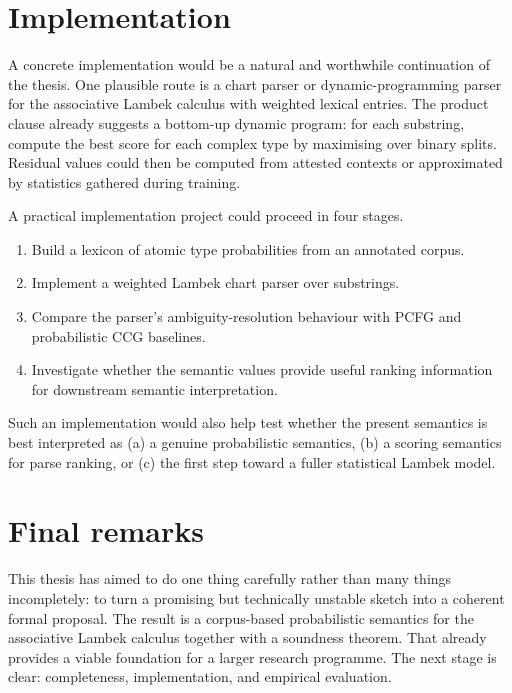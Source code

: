 \section{Implementation}
A concrete implementation would be a natural and worthwhile continuation of the thesis.
One plausible route is a chart parser or dynamic-programming parser for the associative Lambek
calculus with weighted lexical entries. The product clause already suggests a bottom-up dynamic
program: for each substring, compute the best score for each complex type by maximising over
binary splits. Residual values could then be computed from attested contexts or approximated by
statistics gathered during training.

A practical implementation project could proceed in four stages.
\begin{enumerate}[label=(\arabic*)]
    \item Build a lexicon of atomic type probabilities from an annotated corpus.
    \item Implement a weighted Lambek chart parser over substrings.
    \item Compare the parser's ambiguity-resolution behaviour with PCFG and probabilistic CCG
    baselines.
    \item Investigate whether the semantic values provide useful ranking information for downstream
    semantic interpretation.
\end{enumerate}

Such an implementation would also help test whether the present semantics is best interpreted as
(a) a genuine probabilistic semantics, (b) a scoring semantics for parse ranking, or (c) the first
step toward a fuller statistical Lambek model.


\section{Final remarks}
This thesis has aimed to do one thing carefully rather than many things incompletely: to turn a
promising but technically unstable sketch into a coherent formal proposal. The result is a
corpus-based probabilistic semantics for the associative Lambek calculus together with a
soundness theorem. That already provides a viable foundation for a larger research programme.
The next stage is clear: completeness, implementation, and empirical evaluation.
